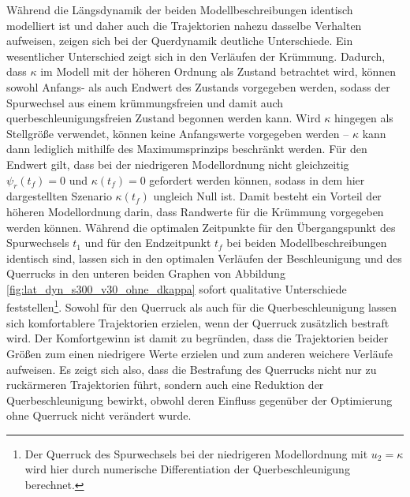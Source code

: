 Während die Längsdynamik der beiden Modellbeschreibungen identisch modelliert ist und daher auch die Trajektorien nahezu dasselbe Verhalten aufweisen, zeigen sich bei der Querdynamik deutliche Unterschiede. Ein wesentlicher Unterschied zeigt sich in den Verläufen der Krümmung. Dadurch, dass $\kappa$ im Modell mit der höheren Ordnung als Zustand betrachtet wird, können sowohl Anfangs- als auch Endwert des Zustands vorgegeben werden, sodass der Spurwechsel aus einem krümmungsfreien und damit auch querbeschleunigungsfreien Zustand begonnen werden kann. Wird $\kappa$ hingegen als Stellgröße verwendet, können keine Anfangswerte vorgegeben werden -- $\kappa$ kann dann lediglich mithilfe des Maximumsprinzips beschränkt werden. Für den Endwert gilt, dass bei der niedrigeren Modellordnung nicht gleichzeitig $\psi_r(t_f) = 0$ und $\kappa(t_f) = 0$ gefordert werden können, sodass in dem hier dargestellten Szenario $\kappa(t_f)$ ungleich Null ist. Damit besteht ein Vorteil der höheren Modellordnung darin, dass Randwerte für die Krümmung vorgegeben werden können. Während die optimalen Zeitpunkte für den Übergangspunkt des Spurwechsels $t_1$ und für den Endzeitpunkt $t_f$ bei beiden Modellbeschreibungen identisch sind, lassen sich in den optimalen Verläufen der Beschleunigung und des Querrucks in den unteren beiden Graphen von Abbildung \ref{fig:lat_dyn_s300_v30_ohne_dkappa} sofort qualitative Unterschiede feststellen\footnote{Der Querruck des Spurwechsels bei der niedrigeren Modellordnung mit $u_2 = \kappa$ wird hier durch numerische Differentiation der Querbeschleunigung berechnet.}. Sowohl für den Querruck als auch für die Querbeschleunigung lassen sich komfortablere Trajektorien erzielen, wenn der Querruck zusätzlich bestraft wird. Der Komfortgewinn ist damit zu begründen, dass die Trajektorien beider Größen zum einen niedrigere Werte erzielen und zum anderen weichere Verläufe aufweisen. Es zeigt sich also, dass die Bestrafung des Querrucks nicht nur zu ruckärmeren Trajektorien führt, sondern auch eine Reduktion der Querbeschleunigung bewirkt, obwohl deren Einfluss gegenüber der Optimierung ohne Querruck nicht verändert wurde.


